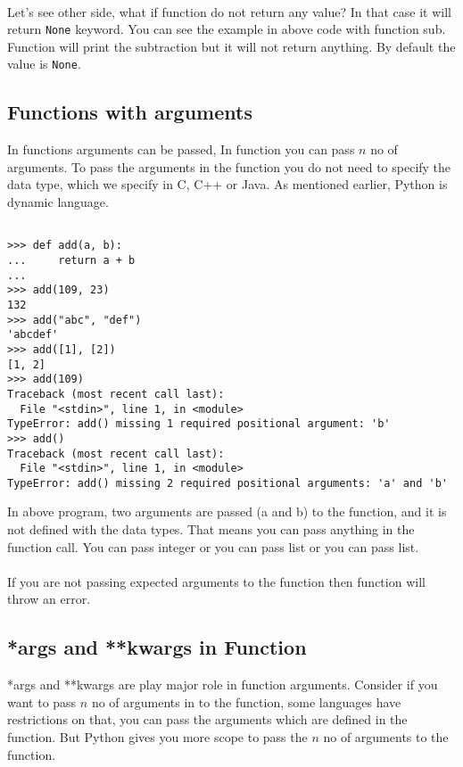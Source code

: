 \documentclass[letterpaper,12pt]{book}
\begin{document}
\paragraph{}
Let's see other side, what if function do not return any value? In that case it will return \texttt{None} keyword. You can see the example in above code with function sub. Function will print the subtraction but it will not return anything. By default the value is \texttt{None}.
\subsection{Functions with arguments}
In functions arguments can be passed, In function you can pass $n$ no of arguments. To pass the arguments in the function you do not need to specify the data type, which we specify in C, C++ or Java. As mentioned earlier, Python is dynamic language.
\begin{lstlisting}

>>> def add(a, b):
...     return a + b
... 
>>> add(109, 23)
132
>>> add("abc", "def")
'abcdef'
>>> add([1], [2])
[1, 2]
>>> add(109)
Traceback (most recent call last):
  File "<stdin>", line 1, in <module>
TypeError: add() missing 1 required positional argument: 'b'
>>> add()
Traceback (most recent call last):
  File "<stdin>", line 1, in <module>
TypeError: add() missing 2 required positional arguments: 'a' and 'b'
\end{lstlisting}
In above program, two arguments are passed (a and b) to the function, and it is not defined with the data types. That means you can pass anything in the function call. You can pass integer or you can pass list or you can pass list.
\paragraph{}
If you are not passing expected arguments to the function then function will throw an error.

\subsection{*args and **kwargs in Function}
*args and **kwargs are play major role in function arguments. Consider if you want to pass $n$ no of arguments in to the function, some languages have restrictions on that, you can pass the arguments which are defined in the function. But Python gives you more scope to pass the $n$ no of arguments to the function.
\end{document}
